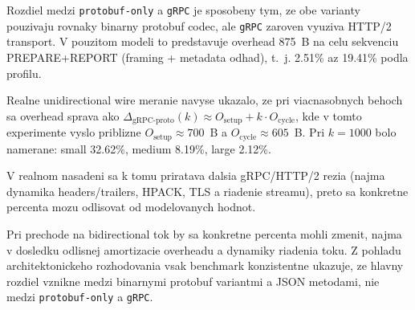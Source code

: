 \documentclass[12pt,a4paper]{report}
\begin{document}
Rozdiel medzi \texttt{protobuf-only} a \texttt{gRPC} je sposobeny tym,
ze obe varianty pouzivaju rovnaky binarny protobuf codec, ale \texttt{gRPC}
zaroven vyuziva HTTP/2 transport. V pouzitom modeli to predstavuje overhead
875~B na celu sekvenciu PREPARE+REPORT (framing + metadata odhad),
t.~j. 2.51\% az 19.41\% podla profilu.

Realne unidirectional wire meranie navyse ukazalo, ze pri viacnasobnych behoch
sa overhead sprava ako
$\Delta_{\text{gRPC-proto}}(k) \approx O_{\text{setup}} + k\cdot O_{\text{cycle}}$,
kde v tomto experimente vyslo priblizne
$O_{\text{setup}}\approx700$~B a $O_{\text{cycle}}\approx605$~B.
Pri $k=1000$ bolo namerane:
small 32.62\%, medium 8.19\%, large 2.12\%.

V realnom nasadeni sa k tomu priratava dalsia gRPC/HTTP/2 rezia
(najma dynamika headers/trailers, HPACK, TLS a riadenie streamu), preto sa
konkretne percenta mozu odlisovat od modelovanych hodnot.

Pri prechode na bidirectional tok by sa konkretne percenta mohli zmenit,
najma v dosledku odlisnej amortizacie overheadu a dynamiky riadenia toku.
Z pohladu architektonickeho rozhodovania vsak benchmark konzistentne ukazuje,
ze hlavny rozdiel vznikne medzi binarnymi protobuf variantmi a JSON metodami,
nie medzi \texttt{protobuf-only} a \texttt{gRPC}.
\end{document}
